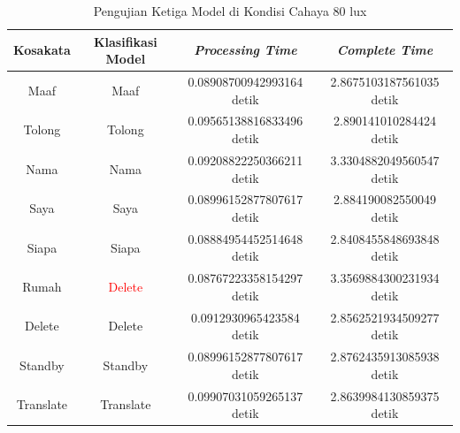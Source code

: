 \begin{longtable}{|c|c|c|c|}
  \caption{Pengujian Ketiga Model di Kondisi Cahaya 80 lux}
  \label{tb:prediksiremang3}                                   \\
  \hline
  \rowcolor[HTML]{C0C0C0}
  \textbf{Kosakata} & \textbf{Klasifikasi Model} & \textbf{\emph{Processing Time}} & \textbf{\emph{Complete Time}}\\
  \hline
  Maaf              & Maaf                          & 0.08908700942993164 detik                          & 2.8675103187561035 detik                                  \\
  Tolong            & Tolong                        & 0.09565138816833496 detik                          & 2.890141010284424 detik                                 \\
  Nama              & Nama                          & 0.09208822250366211 detik                          & 3.3304882049560547 detik                                  \\
  Saya              & Saya                          & 0.08996152877807617 detik                          & 2.884190082550049 detik                                 \\
  Siapa             & Siapa                         & 0.08884954452514648 detik                          & 2.8408455848693848 detik                                  \\
  Rumah             & \textcolor{red}{Delete}       & 0.08767223358154297 detik                          & 3.3569884300231934 detik                                  \\
  Delete            & Delete                        & 0.0912930965423584 detik                           & 2.8562521934509277 detik                                  \\
  Standby           & Standby                       & 0.08996152877807617 detik                          & 2.8762435913085938 detik                                  \\
  Translate         & Translate                     & 0.09907031059265137 detik                          & 2.8639984130859375 detik                                  \\
  \hline
\end{longtable}

